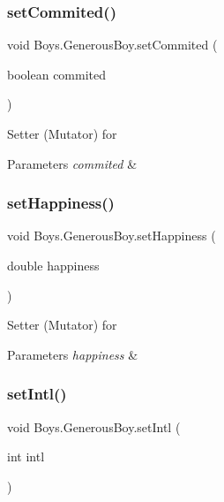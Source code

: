\subsubsection{\texorpdfstring{set\+Commited()}{setCommited()}}
{\footnotesize\ttfamily void Boys.\+Generous\+Boy.\+set\+Commited (\begin{DoxyParamCaption}\item[{boolean}]{commited }\end{DoxyParamCaption})\hspace{0.3cm}{\ttfamily [inline]}}

Setter (Mutator) for 
\begin{DoxyParams}{Parameters}
{\em commited} & \\
\hline
\end{DoxyParams}
\mbox{\label{class_boys_1_1_generous_boy_a6596e9b9eb1423dfb62ffd3266323ee0}} 
\subsubsection{\texorpdfstring{set\+Happiness()}{setHappiness()}}
{\footnotesize\ttfamily void Boys.\+Generous\+Boy.\+set\+Happiness (\begin{DoxyParamCaption}\item[{double}]{happiness }\end{DoxyParamCaption})\hspace{0.3cm}{\ttfamily [inline]}}

Setter (Mutator) for 
\begin{DoxyParams}{Parameters}
{\em happiness} & \\
\hline
\end{DoxyParams}
\mbox{\label{class_boys_1_1_generous_boy_a744fa0a1db4b6c16586d27b4a9457157}} 
\subsubsection{\texorpdfstring{set\+Intl()}{setIntl()}}
{\footnotesize\ttfamily void Boys.\+Generous\+Boy.\+set\+Intl (\begin{DoxyParamCaption}\item[{int}]{intl }\end{DoxyParamCaption})\hspace{0.3cm}{\ttfamily [inline]}}

